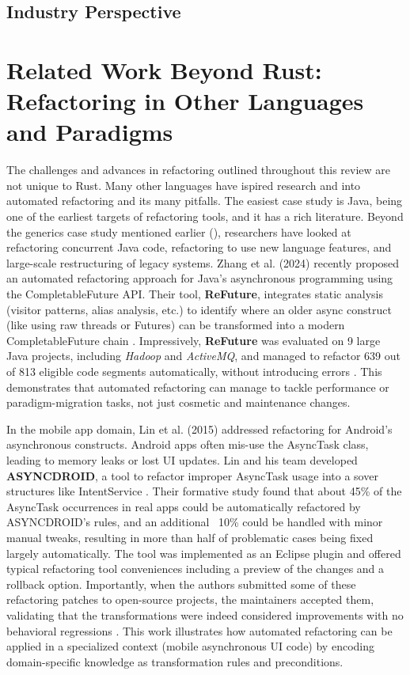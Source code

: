 \subsection{Industry Perspective}

\section{Related Work Beyond Rust: Refactoring in Other Languages and Paradigms}
\label{sec:related_work_beyond_rust}
The challenges and advances in refactoring outlined throughout this review are
not unique to Rust. Many other languages have ispired research and into
automated refactoring and its many pitfalls. The easiest case study is Java,
being one of the earliest targets of refactoring tools, and it has a rich
literature. Beyond the generics case study mentioned earlier
(\cite{GenericRefactoringJAVA}), researchers have looked at refactoring
concurrent Java code, refactoring to use new language features, and large-scale
restructuring of legacy systems. Zhang et al. (2024) recently proposed an
automated refactoring approach for Java's asynchronous programming using the
CompletableFuture API. Their tool, \textbf{ReFuture}, integrates static analysis
(visitor patterns, alias analysis, etc.) to identify where an older async
construct (like using raw threads or Futures) can be transformed into a modern
CompletableFuture chain \cite{AutomaticRefactoringAsyncJAVA}. Impressively,
\textbf{ReFuture} was evaluated on 9 large Java projects, including
\textit{Hadoop} and \textit{ActiveMQ}, and managed to refactor 639 out of 813
eligible code segments automatically, without introducing errors
\cite{AutomaticRefactoringAsyncJAVA}. This demonstrates that automated
refactoring can manage to tackle performance or paradigm-migration tasks, not just
cosmetic and maintenance changes.

In the mobile app domain, Lin et al. (2015) addressed refactoring for Android's
asynchronous constructs. Android apps often mis-use the AsyncTask class, leading
to memory leaks or lost UI updates. Lin and his team developed
\textbf{ASYNCDROID}, a tool to refactor improper AsyncTask usage into a sover
structures like IntentService \cite{AndroidAsncRefactoring}. Their formative
study found that about 45\% of the AsyncTask occurrences in real apps could be
automatically refactored by ASYNCDROID's rules, and an additional ~10\% could
be handled with minor manual tweaks, resulting in more than half of problematic
cases being fixed largely automatically. The tool was implemented as an Eclipse
plugin and offered typical refactoring tool conveniences including a preview of
the changes and a rollback option. Importantly, when the authors submitted some
of these refactoring patches to open-source projects, the maintainers accepted
them, validating that the transformations were indeed considered improvements
with no behavioral regressions \cite{AndroidAsncRefactoring}. This work
illustrates how automated refactoring can be applied in a specialized context
(mobile asynchronous UI code) by encoding domain-specific knowledge as
transformation rules and preconditions.

